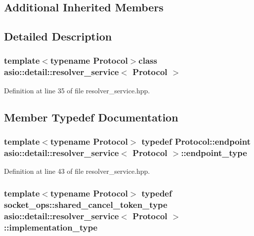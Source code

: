 \subsection*{Additional Inherited Members}


\subsection{Detailed Description}
\subsubsection*{template$<$typename Protocol$>$class asio\+::detail\+::resolver\+\_\+service$<$ Protocol $>$}



Definition at line 35 of file resolver\+\_\+service.\+hpp.



\subsection{Member Typedef Documentation}
\hypertarget{classasio_1_1detail_1_1resolver__service_a4c9bdef1b2990355b5e02df3056554df}{}
\subsubsection[{endpoint\+\_\+type}]{\setlength{\rightskip}{0pt plus 5cm}template$<$typename Protocol$>$ typedef Protocol\+::endpoint {\bf asio\+::detail\+::resolver\+\_\+service}$<$ Protocol $>$\+::{\bf endpoint\+\_\+type}}\label{classasio_1_1detail_1_1resolver__service_a4c9bdef1b2990355b5e02df3056554df}


Definition at line 43 of file resolver\+\_\+service.\+hpp.

\hypertarget{classasio_1_1detail_1_1resolver__service_a9b39aff4ee39b0f45731ec01d9f5fd74}{}
\subsubsection[{implementation\+\_\+type}]{\setlength{\rightskip}{0pt plus 5cm}template$<$typename Protocol$>$ typedef {\bf socket\+\_\+ops\+::shared\+\_\+cancel\+\_\+token\+\_\+type} {\bf asio\+::detail\+::resolver\+\_\+service}$<$ Protocol $>$\+::{\bf implementation\+\_\+type}}\label{classasio_1_1detail_1_1resolver__service_a9b39aff4ee39b0f45731ec01d9f5fd74}


